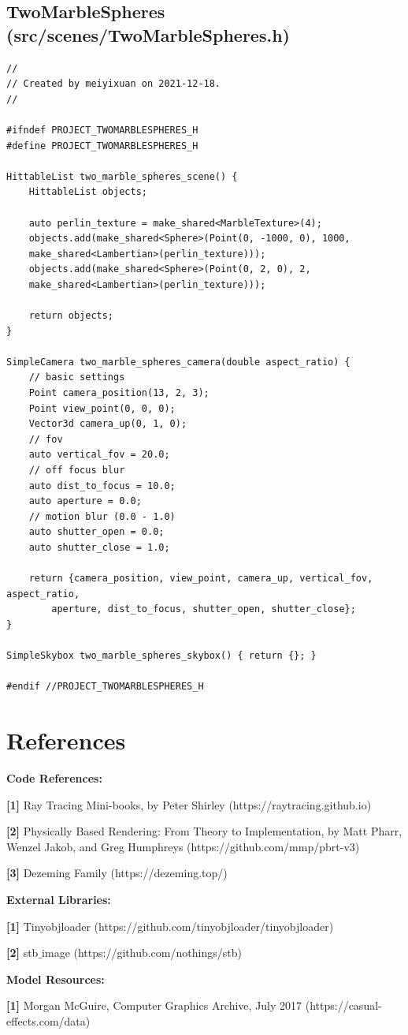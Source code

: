 \documentclass[utf8]{article}
\begin{document}
\subsection{TwoMarbleSpheres (src/scenes/TwoMarbleSpheres.h)}
\begin{lstlisting}[style=CStyle]
//
// Created by meiyixuan on 2021-12-18.
//

#ifndef PROJECT_TWOMARBLESPHERES_H
#define PROJECT_TWOMARBLESPHERES_H

HittableList two_marble_spheres_scene() {
	HittableList objects;
	
	auto perlin_texture = make_shared<MarbleTexture>(4);
	objects.add(make_shared<Sphere>(Point(0, -1000, 0), 1000,
	make_shared<Lambertian>(perlin_texture)));
	objects.add(make_shared<Sphere>(Point(0, 2, 0), 2,
	make_shared<Lambertian>(perlin_texture)));
	
	return objects;
}

SimpleCamera two_marble_spheres_camera(double aspect_ratio) {
	// basic settings
	Point camera_position(13, 2, 3);
	Point view_point(0, 0, 0);
	Vector3d camera_up(0, 1, 0);
	// fov
	auto vertical_fov = 20.0;
	// off focus blur
	auto dist_to_focus = 10.0;
	auto aperture = 0.0;
	// motion blur (0.0 - 1.0)
	auto shutter_open = 0.0;
	auto shutter_close = 1.0;
	
	return {camera_position, view_point, camera_up, vertical_fov, aspect_ratio,
		aperture, dist_to_focus, shutter_open, shutter_close};
}

SimpleSkybox two_marble_spheres_skybox() { return {}; }

#endif //PROJECT_TWOMARBLESPHERES_H

\end{lstlisting}

\section{References}
\noindent
\textbf{Code References: }

\noindent
\textbf{[1]} Ray Tracing Mini-books, by Peter Shirley (https://raytracing.github.io)

\noindent
\textbf{[2]} Physically Based Rendering: From Theory to Implementation, by Matt Pharr, Wenzel Jakob, and Greg Humphreys (https://github.com/mmp/pbrt-v3)

\noindent
\textbf{[3]} Dezeming Family (https://dezeming.top/)

\noindent
\textbf{External Libraries: }

\noindent
\textbf{[1]} Tinyobjloader (https://github.com/tinyobjloader/tinyobjloader)

\noindent
\textbf{[2]} stb$\_$image (https://github.com/nothings/stb)

\noindent
\textbf{Model Resources: }

\noindent
\textbf{[1]} Morgan McGuire, Computer Graphics Archive, July 2017 (https://casual-effects.com/data)
\end{document}
